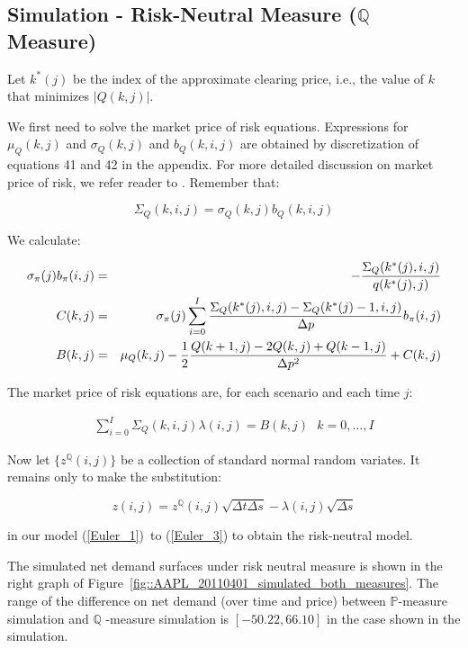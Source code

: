 \documentclass{article}
\begin{document}
\subsection{Simulation - Risk-Neutral Measure ($\mathbb{Q}$ Measure)}

Let $k^{\ast }(j)$ be the index of the approximate clearing price, i.e., the
value of $k$ that minimizes $|Q(k,j)|$.

We first need to solve the market price of risk equations. Expressions for $%
\mu _{Q}(k,j)$ and $\sigma _{Q}(k,j)$ and $b_{Q}(k,i,j)$ are obtained by
discretization of equations 41 and 42 in the appendix. For more detailed discussion on market price of risk, we refer reader to \cite{NB97}. Remember that:

\[
\Sigma _{Q}(k,i,j)=\sigma _{Q}(k,j)b_{Q}(k,i,j)
\]

We calculate:

\begin{eqnarray*}
\sigma _{\pi }(j)b_{\pi }(i,j) &=&-\frac{\Sigma _{Q}(k^{\ast }(j),i,j)}{%
q(k^{\ast }(j),j)} \\
C(k,j) &=&\sigma _{\pi }(j)\sum_{i=0}^{I}\frac{\Sigma _{Q}(k^{\ast
}(j),i,j)-\Sigma _{Q}(k^{\ast }(j)-1,i,j)}{\Delta p}b_{\pi }(i,j) \\
B(k,j) &=&\mu _{Q}(k,j)-\frac{1}{2}\frac{Q(k+1,j)-2Q(k,j)+Q(k-1,j)}{\Delta
p^{2}}+C(k,j)
\end{eqnarray*}

The market price of risk equations are, for each scenario and each time $j$:

\begin{eqnarray} \label{eqn::market_price_risk_equation}
\sum_{i=0}^{I}\Sigma _{Q}(k,i,j)\lambda (i,j)=B(k,j)\text{ \ \ \ }k=0,...,I
\end{eqnarray}

Now let $\{z^{\mathbb{Q}}(i,j)\}$ be a collection of standard normal random
variates. It remains only to make the substitution:

\[
z(i,j)=z^{\mathbb{Q}}(i,j)\sqrt{\Delta t\Delta s}-\lambda (i,j)\sqrt{\Delta s%
}
\]

in our model (\ref{Euler_1})\ to (\ref{Euler_3}) to obtain the risk-neutral
model.

The simulated net demand surfaces under risk neutral measure is shown in the
right graph of Figure~\ref{fig::AAPL_20110401_simulated_both_measures}. The
range of the difference on net demand (over time and price)
between $\mathbb{P}$-measure simulation and $\mathbb{Q}$%
-measure simulation is $[-50.22,66.10]$ in the case shown in the simulation.
\end{document}
